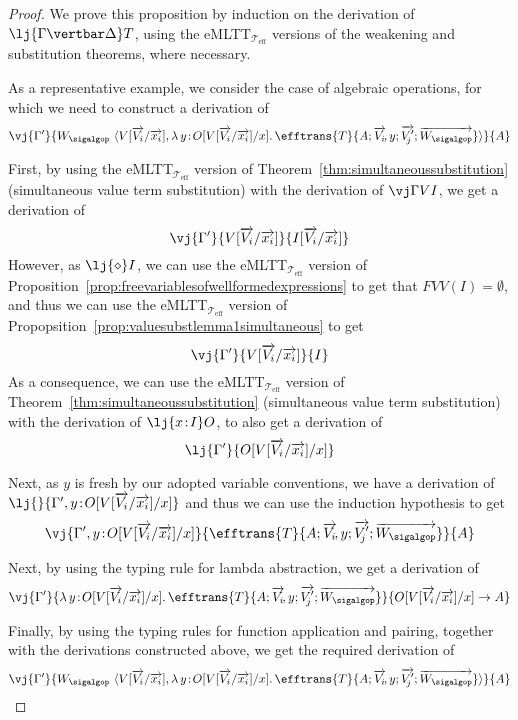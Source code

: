 \begin{proof}
We prove this proposition by induction on the derivation of $\lj {\Gamma \vertbar \Delta} T$, using the eMLTT$_{\mathcal{T}_{\text{eff}}}$ versions of the weakening and substitution theorems, where necessary.

As a representative example, we consider the case of algebraic operations, for which we need to construct a derivation of
\[
\vj {\Gamma'} {W_{\sigalgop}\,\, \langle V[\overrightarrow{V_i}/\overrightarrow{x_i}] , \lambda\, y \!:\! O[V[\overrightarrow{V_i}/\overrightarrow{x_i}]/x] .\, \efftrans {T} {A; \overrightarrow{V_i}\!, y; \overrightarrow{V'_{\!j}}; \overrightarrow{W_{\sigalgop}}}\rangle} {A}
\]

First, by using the eMLTT$_{\mathcal{T}_{\text{eff}}}$ version of Theorem~\ref{thm:simultaneoussubstitution} (simultaneous value term substitution) with the derivation of $\vj \Gamma V I$, we get a derivation of
\[
\vj {\Gamma'} {V[\overrightarrow{V_i}/\overrightarrow{x_i}]} {I[\overrightarrow{V_i}/\overrightarrow{x_i}]}
\]
However, as $\lj {\diamond} I$, we can use the eMLTT$_{\mathcal{T}_{\text{eff}}}$ version of Proposition~\ref{prop:freevariablesofwellformedexpressions} to get that $FVV(I) = \emptyset$, and 
thus we can use the eMLTT$_{\mathcal{T}_{\text{eff}}}$ version of Propopsition~\ref{prop:valuesubstlemma1simultaneous} to get 
\[
\vj {\Gamma'} {V[\overrightarrow{V_i}/\overrightarrow{x_i}]} {I}
\]
As a consequence, we can use the eMLTT$_{\mathcal{T}_{\text{eff}}}$ version of Theorem~\ref{thm:simultaneoussubstitution} (simultaneous value term substitution) with the derivation of $\lj {x \!:\! I} O$, to also get a derivation of
\[
\lj {\Gamma'} {O[V[\overrightarrow{V_i}/\overrightarrow{x_i}]/x]}
\]

Next, as $y$ is fresh by our adopted variable conventions, we have a derivation of $\lj {} {\Gamma', y \!:\! O[V[\overrightarrow{V_i}/\overrightarrow{x_i}]/x]}$ 
and thus we can use the induction hypothesis to get 
\[
\vj {\Gamma', y \!:\! O[V[\overrightarrow{V_i}/\overrightarrow{x_i}]/x]} {\efftrans {T} {A; \overrightarrow{V_i}\!, y; \overrightarrow{V'_{\!j}}; \overrightarrow{W_{\sigalgop}}}} {A}
\]

Next, by using the typing rule for lambda abstraction, we get a derivation of
\[
\vj {\Gamma'} {\lambda\, y \!:\! O[V[\overrightarrow{V_i}/\overrightarrow{x_i}]/x] .\, \efftrans {T} {A; \overrightarrow{V_i}\!, y; \overrightarrow{V'_{\!j}}; \overrightarrow{W_{\sigalgop}}}} {O[V[\overrightarrow{V_i}/\overrightarrow{x_i}]/x] \to A}
\]

Finally, by using the typing rules for function application and pairing, together with the derivations constructed above, we get the required derivation of
\[
\vj {\Gamma'} {W_{\sigalgop}\,\, \langle V[\overrightarrow{V_i}/\overrightarrow{x_i}] , \lambda\, y \!:\! O[V[\overrightarrow{V_i}/\overrightarrow{x_i}]/x] .\, \efftrans {T} {A; \overrightarrow{V_i}\!, y; \overrightarrow{V'_{\!j}}; \overrightarrow{W_{\sigalgop}}}\rangle} {A}
\]
\end{proof}

